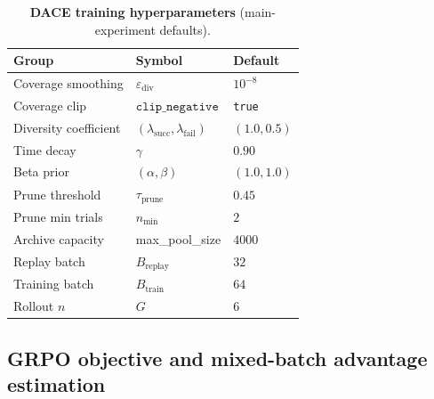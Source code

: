 \documentclass{article}
\newcommand{\method}{\textsc{DACE}\xspace}
\begin{document}
\begin{table}[h]
  \centering
  \small
  \caption{\textbf{\method training hyperparameters} (main-experiment defaults).}
  \label{tab:hyperparams}
  \setlength{\tabcolsep}{6pt}
  \begin{tabular}{lll}
    \toprule
    \textbf{Group} & \textbf{Symbol} & \textbf{Default} \\
    \midrule
    Coverage smoothing    & $\varepsilon_{\mathrm{div}}$ & $10^{-8}$ \\
    Coverage clip         & $\mathtt{clip\_negative}$ & \texttt{true} \\
    Diversity coefficient & $(\lambda_{\mathrm{succ}}, \lambda_{\mathrm{fail}})$ & $(1.0, 0.5)$ \\
    Time decay            & $\gamma$ & $0.90$ \\
    Beta prior            & $(\alpha, \beta)$ & $(1.0, 1.0)$ \\
    Prune threshold       & $\tau_{\mathrm{prune}}$ & $0.45$ \\
    Prune min trials      & $n_{\min}$ & $2$ \\
    Archive capacity      & max\_pool\_size & $4000$ \\
    Replay batch          & $B_{\mathrm{replay}}$ & $32$ \\
    Training batch        & $B_{\mathrm{train}}$ & $64$ \\
    Rollout $n$           & $G$ & $6$ \\
    \bottomrule
  \end{tabular}
\end{table}


\subsection{GRPO objective and mixed-batch advantage estimation}
\label{apdx:grpo}
\end{document}
